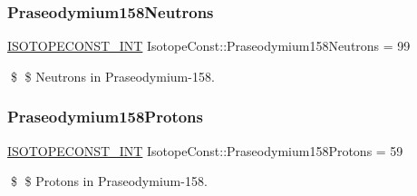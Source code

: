 \subsubsection{\texorpdfstring{Praseodymium158\+Neutrons}{Praseodymium158Neutrons}}
{\footnotesize\ttfamily \mbox{\hyperlink{group___isotope_const-_macros_ga5f18360b3e99483a35c32d789e62621c}{I\+S\+O\+T\+O\+P\+E\+C\+O\+N\+S\+T\+\_\+\+I\+NT}} Isotope\+Const\+::\+Praseodymium158\+Neutrons = 99}

\$ \$ Neutrons in Praseodymium-\/158. \mbox{\label{group___isotope_const-_praseodymium-_pr158_gaf6fe8dbd43e0128d3000883e8921eedd}} 
\subsubsection{\texorpdfstring{Praseodymium158\+Protons}{Praseodymium158Protons}}
{\footnotesize\ttfamily \mbox{\hyperlink{group___isotope_const-_macros_ga5f18360b3e99483a35c32d789e62621c}{I\+S\+O\+T\+O\+P\+E\+C\+O\+N\+S\+T\+\_\+\+I\+NT}} Isotope\+Const\+::\+Praseodymium158\+Protons = 59}

\$ \$ Protons in Praseodymium-\/158. 